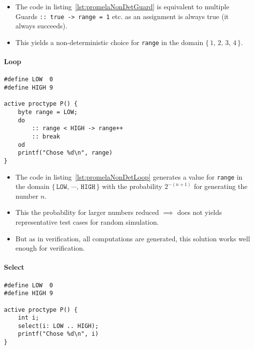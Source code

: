 \documentclass[a4paper, 11pt, accentcolor = tud3b]{tudreport}
\newcommand{\inlinePromela}[1]{\lstinline[language = PROMELA]|#1|}
\begin{document}
					\begin{itemize}
						\item The code in listing~\ref{lst:promelaNonDetGuard} is equivalent to multiple Guards \inlinePromela{:: true -> range = 1} etc. as an assignment is always true (it always succeeds).
						\item This yields a non-deterministic choice for \inlinePromela{range} in the domain \( \{\, 1,\, 2,\, 3,\, 4 \,\} \).
					\end{itemize}
				
				\paragraph{Loop}
					\begin{lstlisting}[caption = { PROMELA Non-Deterministic Value Generation by Loop }, label = lst:promelaNonDetLoop, language = PROMELA]
#define LOW  0
#define HIGH 9

active proctype P() {
	byte range = LOW;
	do
		:: range < HIGH -> range++
		:: break
	od
	printf("Chose %d\n", range)
}
					\end{lstlisting}
					
					\begin{itemize}
						\item The code in listing~\ref{lst:promelaNonDetLoop} generates a value for \inlinePromela{range} in the domain \( \{\, \texttt{LOW},\, \cdots,\, \texttt{HIGH} \,\} \) with the probability \( 2^{-(n + 1)} \) for generating the number \(n\).
						\item This the probability for larger numbers reduced \( \implies \) does not yields representative test cases for random simulation.
						\item But as in verification, all computations are generated, this solution works well enough for verification.
					\end{itemize}
				
				\paragraph{Select}
					\begin{lstlisting}[caption = { PROMELA Non-Deterministic Value Generation by Select }, label = lst:promelaNonDetSelect, language = PROMELA]
#define LOW  0
#define HIGH 9

active proctype P() {
	int i;
	select(i: LOW .. HIGH);
	printf("Chose %d\n", i)
}
					\end{lstlisting}
					
\end{document}
